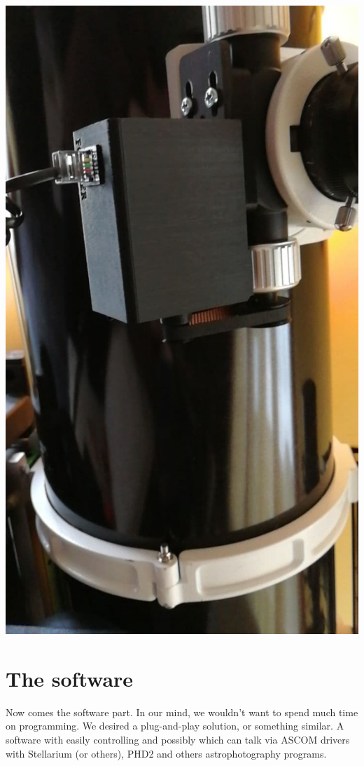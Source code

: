 \documentclass{article}
\begin{document}
\begin{multicols}{2}
        \begin{minipage}
            {0.5\textwidth}
            \centering
            \includegraphics[scale=0.5]{FOCUSER-box.jpg}
            \label{fig:focuser-box}
        \end{minipage}

        \section{The software}
        Now comes the software part.
        In our mind, we wouldn't want to spend much time on programming.
        We desired a plug-and-play solution, or something similar.
        A software with easily controlling and possibly which can talk via ASCOM drivers with Stellarium (or others), PHD2 and others astrophotography programs.


\end{multicols}
\end{document}
